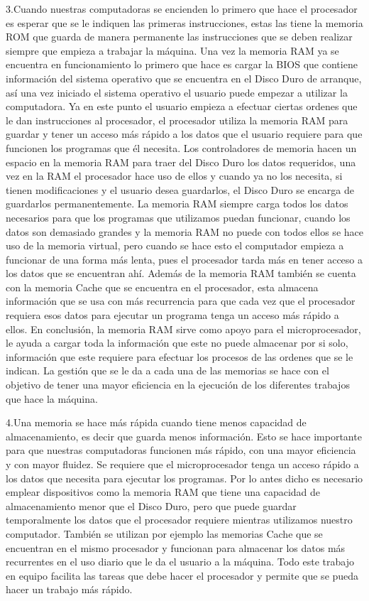 \documentclass{article}
\begin{document}
3.Cuando nuestras computadoras se encienden lo primero que hace el procesador es esperar que se le indiquen las primeras instrucciones, estas las tiene la memoria ROM que guarda de manera permanente las instrucciones que se deben realizar siempre que empieza a trabajar la máquina. Una vez la memoria RAM ya se encuentra en funcionamiento lo primero que hace es cargar la BIOS que contiene información del sistema operativo que se encuentra en el Disco Duro de arranque, así una vez iniciado el sistema operativo el usuario puede empezar a utilizar la computadora. Ya en este punto el usuario empieza a efectuar ciertas ordenes que le dan instrucciones al procesador, el procesador utiliza la memoria RAM para guardar y tener un acceso más rápido a los datos que el usuario requiere para que funcionen los programas que él necesita. Los controladores de memoria hacen un espacio en la memoria RAM para traer del Disco Duro los datos requeridos, una vez en la RAM el procesador hace uso de ellos y cuando ya no los necesita, si tienen modificaciones y el usuario desea guardarlos, el Disco Duro se encarga de guardarlos permanentemente. La memoria RAM siempre carga todos los datos necesarios para que los programas que utilizamos puedan funcionar, cuando los datos son demasiado grandes y la memoria RAM no puede con todos ellos se hace uso de la memoria virtual, pero cuando se hace esto el computador empieza a funcionar de una forma más lenta, pues el procesador tarda más en tener acceso a los datos que se encuentran ahí. Además de la memoria RAM también se cuenta con la memoria Cache que se encuentra en el procesador, esta almacena información que se usa con más recurrencia para que cada vez que el procesador requiera esos datos para ejecutar un programa tenga un acceso más rápido a ellos. En conclusión, la memoria RAM sirve como apoyo para el microprocesador, le ayuda a cargar toda la información que este no puede almacenar por si solo, información que este requiere para efectuar los procesos de las ordenes que se le indican.  La gestión que se le da a cada una de las memorias se hace con el objetivo de tener una mayor eficiencia en la ejecución de los diferentes trabajos que hace la máquina.

4.Una memoria se hace más rápida cuando tiene menos capacidad de almacenamiento, es decir que guarda menos información. Esto se hace importante para que nuestras computadoras funcionen más rápido, con una mayor eficiencia y con mayor fluidez. Se requiere que el microprocesador tenga un acceso rápido a los datos que necesita para ejecutar los programas. Por lo antes dicho es necesario emplear dispositivos como la memoria RAM que tiene una capacidad de almacenamiento menor que el Disco Duro, pero que puede guardar temporalmente los datos que el procesador requiere mientras utilizamos nuestro computador. También se utilizan por ejemplo las memorias Cache que se encuentran en el mismo procesador y funcionan para almacenar los datos más recurrentes en el uso diario que le da el usuario a la máquina. Todo este trabajo en equipo facilita las tareas que debe hacer el procesador y permite que se pueda hacer un trabajo más rápido.
\end{document}
